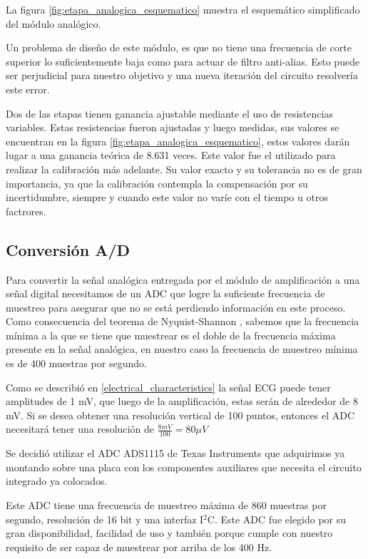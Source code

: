 \documentclass[conference]{IEEEtran}
\begin{document}
La figura \ref{fig:etapa_analogica_esquematico} muestra el esquemático
simplificado del módulo analógico.

Un problema de diseño de este módulo, es que no tiene una frecuencia de corte
superior lo suficientemente baja como para actuar de filtro anti-alias. Esto
puede ser perjudicial para nuestro objetivo y una nueva iteración del circuito
resolvería este error.

Dos de las etapas tienen ganancia ajustable mediante el uso de resistencias
variables. Estas resistencias fueron ajustadas y luego medidas, sus valores se
encuentran en la figura \ref{fig:etapa_analogica_esquematico}, estos valores
darán lugar a una ganancia teórica de 8.631 veces. Este valor fue el utilizado
para realizar la calibración más adelante. Su valor exacto y su tolerancia no es
de gran importancia, ya que la calibración contempla la compensación por su
incertidumbre, siempre y cuando este valor no varíe con el tiempo u otros
factrores.


\subsection{Conversión A/D}

Para convertir la señal analógica entregada por el módulo de amplificación a una
señal digital necesitamos de un ADC que logre la suficiente frecuencia de
muestreo para asegurar que no se está perdiendo información en este proceso.
Como consecuencia del teorema de Nyquist-Shannon \cite{shannon_sampling},
sabemos que la frecuencia mínima a la que se tiene que muestrear es el doble de
la frecuencia máxima presente en la señal analógica, en nuestro caso la
frecuencia de muestreo mínima es de 400 muestras por segundo.

Como se describió en \ref{electrical_characteristics} la señal ECG puede tener
amplitudes de 1 mV, que luego de la amplificación, estas serán de alrededor de
8 mV. Si se desea obtener una resolución vertical de 100 puntos, entonces el ADC
necesitará tener una resolución de $\frac{8 mV}{100} = 80 \mu V$

Se decidió utilizar el ADC ADS1115 de Texas Instruments \cite{ads1115} que
adquirimos ya montando sobre una placa con los componentes auxiliares que
necesita el circuito integrado ya colocados.

Este ADC tiene una frecuencia de muestreo máxima de 860 muestras por segundo,
resolución de 16 bit y una interfaz I$^2$C. Este ADC fue elegido por su gran
disponibilidad, facilidad de uso y también porque cumple con nuestro requisito
de ser capaz de muestrear por arriba de los 400 Hz.
\end{document}
